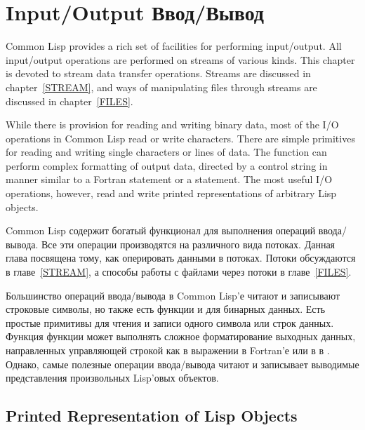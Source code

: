 
\clearpage\def\pagestatus{FINAL PROOF}


\chapter{Input/Output Ввод/Вывод}
\label{IO}

Common Lisp provides a rich set of facilities for performing input/output.
All input/output operations are performed on streams of various kinds.
This chapter is devoted to stream data transfer operations.
Streams are discussed in chapter~\ref{STREAM}, and
ways of manipulating files through streams are discussed in
chapter~\ref{FILES}.

While there is provision for reading and writing binary data,
most of the I/O operations in Common Lisp read or write characters.
There are simple primitives for reading and writing single characters
or lines of data.  The  function can perform complex
formatting of output data, directed by a control string
in manner similar to a Fortran  statement
or a   statement.  The most useful I/O operations,
however, read and write printed representations of arbitrary
Lisp objects.

Common Lisp содержит богатый функционал для выполнения операций ввода/вывода.
Все эти операции производятся на различного вида потоках.
Данная глава посвящена тому, как оперировать данными в потоках.
Потоки обсуждаются в главе~\ref{STREAM}, а способы работы с файлами
через потоки в главе~\ref{FILES}.

Большинство операций ввода/вывода в Common Lisp'е читают и записывают строковые
символы, но также есть функции и для бинарных данных.
Есть простые примитивы для чтения и записи одного символа
или строк данных. Функция  функции может выполнять сложное
форматирование выходных данных, направленных управляющей строкой как в выражении
 в Fortran'е или в  в .
Однако, самые полезные операции ввода/вывода читают и записывает выводимые
представления произвольных Lisp'овых объектов.

\section{Printed Representation of Lisp Objects}

